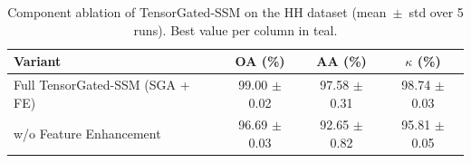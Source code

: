 \begin{table}[htbp]
  \centering
  \caption{Component ablation of TensorGated-SSM on the HH dataset (mean~$\pm$~std over 5 runs). Best value per column in \textcolor{tgteal}{teal}.}
  \label{tab:ablation_hh}
  \begin{tabular}{l c c c}
    \toprule
    Variant & OA (\%) & AA (\%) & $\kappa$ (\%) \\
    \midrule
    Full TensorGated-SSM (SGA + FE) & \textcolor{tgteal}{99.00 $\pm$ 0.02} & \textcolor{tgteal}{97.58 $\pm$ 0.31} & \textcolor{tgteal}{98.74 $\pm$ 0.03} \\
    w/o Feature Enhancement & 96.69 $\pm$ 0.03 & 92.65 $\pm$ 0.82 & 95.81 $\pm$ 0.05 \\
    \bottomrule
  \end{tabular}
\end{table}
